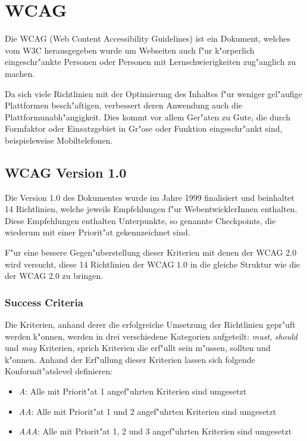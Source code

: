 \documentclass[a4paper,bibtotoc,oneside]{scrbook}
\begin{document}
\chapter{WCAG}
Die WCAG (Web Content Accessibility Guidelines) ist ein Dokument, welches vom W3C herausgegeben wurde um Webseiten auch f"ur k"orperlich eingeschr"ankte Personen oder Personen mit Lernschwierigkeiten zug"anglich zu machen. 

Da sich viele Richtlinien mit der Optimierung des Inhaltes f"ur weniger gel"aufige Plattformen besch"aftigen, verbessert deren Anwendung auch die Plattformunabh"angigkeit. Dies kommt vor allem Ger"aten zu Gute, die durch Formfaktor oder Einsatzgebiet in Gr"ose oder Funktion eingeschr"ankt sind, beispielsweise Mobiltelefonen. \cite[Abschnitt Abstract]{wcag1}


\section{WCAG Version 1.0}
Die Version 1.0 des Dokumentes wurde im Jahre 1999 finalisiert und beinhaltet 14 Richtlinien, welche jeweils Empfehlungen f"ur WebentwicklerInnen enthalten. Diese Empfehlungen enthalten Unterpunkte, so genannte Checkpoints, die wiederum mit einer Priorit"at gekennzeichnet sind. \cite[Abschnitt Abstract]{wcag1}

F"ur eine bessere Gegen"uberstellung dieser Kriterien mit denen der WCAG 2.0 wird versucht, diese 14 Richtlinien der WCAG 1.0 in die gleiche Struktur wie die der WCAG 2.0 zu bringen.

\subsection{Success Criteria}
Die Kriterien, anhand derer die erfolgreiche Umsetzung der Richtlinien gepr"uft werden k"onnen, werden in drei verschiedene Kategorien aufgeteilt: \emph{must}, \emph{should} und \emph{may} Kriterien, sprich Kriterien die erf"ullt sein m"ussen, sollten und k"onnen. Anhand der Erf"ullung dieser Kriterien lassen sich folgende Konformit"atslevel definieren: \cite[Abschnitt 4]{wcag1}

\begin{itemize}
\item \emph{A}: Alle mit Priorit"at 1 angef"uhrten Kriterien sind umgesetzt
\item \emph{AA}: Alle mit Priorit"at 1 und 2 angef"uhrten Kriterien sind umgesetzt
\item \emph{AAA}: Alle mit Priorit"at 1, 2 und 3 angef"uhrten Kriterien sind umgesetzt
\end{itemize}
\end{document}
